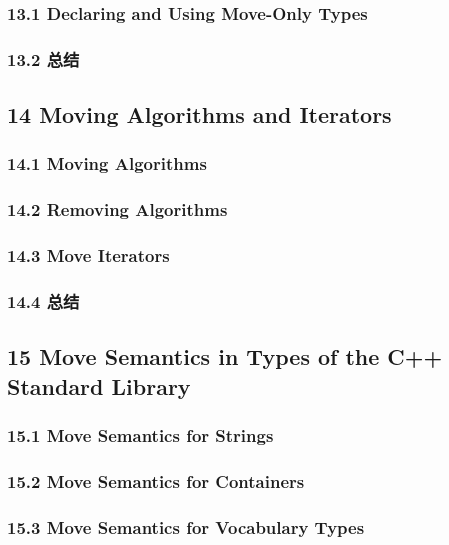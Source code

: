 \documentclass[11pt,a4paper,UTF8]{ctexart}
\begin{document}
		\subsubsection{13.1 Declaring and Using Move-Only Types}
		\subsubsection{13.2 总结}
	\subsection{14 Moving Algorithms and Iterators}
		\subsubsection{14.1 Moving Algorithms}
		\subsubsection{14.2 Removing Algorithms}
		\subsubsection{14.3 Move Iterators}
		\subsubsection{14.4 总结}
	\subsection{15 Move Semantics in Types of the C++ Standard Library}
		\subsubsection{15.1 Move Semantics for Strings}
		\subsubsection{15.2 Move Semantics for Containers}
		\subsubsection{15.3 Move Semantics for Vocabulary Types}
\end{document}
